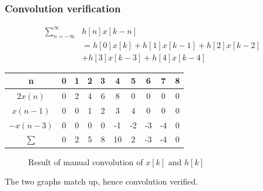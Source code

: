 \documentclass{article}
\begin{document}
\begin{multicols}{2}
    \subsubsection{Convolution verification}
    \begin{align*}
        \sum_{n=-\infty}^\infty & h[n]x[k-n]                           \\
                                & = h[0]x[k] + h[1]x[k-1] + h[2]x[k-2] \\
                                & +h[3]x[k-3] + h[4]x[k-4]
    \end{align*}
    \begin{center}
        \begin{tabular}{| c | c c c c c c c c c | }
            \hline
            n            & 0 & 1 & 2 & 3 & 4  & 5  & 6  & 7  & 8 \\
            \hline
            \(2 x(n)\)   & 0 & 2 & 4 & 6 & 8  & 0  & 0  & 0  & 0 \\
            \(x(n-1)\)   & 0 & 0 & 1 & 2 & 3  & 4  & 0  & 0  & 0 \\
            \(- x(n-3)\) & 0 & 0 & 0 & 0 & -1 & -2 & -3 & -4 & 0 \\
            \hline
            \( \sum \)   & 0 & 2 & 5 & 8 & 10 & 2  & -3 & -4 & 0 \\
            \hline
        \end{tabular}
    \end{center}
    \begin{figure}[H]
        \centering
        \caption{Result of manual convolution of \(x[k] \text{ and } h[k]\)}
    \end{figure}
    The two graphs match up, hence convolution verified.


\end{multicols}
\end{document}
